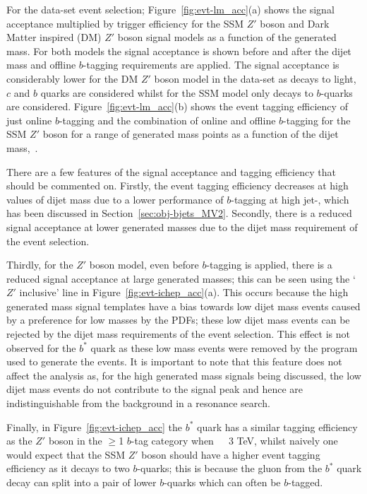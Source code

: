 For the \lm{} data-set event selection;
Figure~\ref{fig:evt-lm_acc}(a) shows the signal acceptance multiplied by trigger efficiency
for the SSM $Z'$ boson and  Dark Matter inspired (DM) $Z'$ boson signal models as a function of the generated mass.
For both models the signal acceptance is shown before and after the
dijet mass and offline $b$-tagging requirements are applied.
The signal acceptance is considerably lower for the DM $Z'$ boson model in the \lm{} data-set
as decays to light, $c$ and $b$ quarks are considered
whilst for the SSM model only decays to $b$-quarks are considered.
Figure~\ref{fig:evt-lm_acc}(b) shows the event tagging efficiency
of just online $b$-tagging and the combination of online and offline $b$-tagging
for the SSM $Z'$ boson for a range of generated mass points
as a function of the dijet mass,~\mjj.

There are a few features of the signal acceptance and tagging efficiency that should be commented on.
Firstly, the event tagging efficiency decreases at high values of dijet mass
due to a lower performance of $b$-tagging at high jet-\pT,
which has been discussed in Section~\ref{sec:obj-bjets_MV2}.
Secondly, there is a reduced signal acceptance at lower generated masses
due to the dijet mass requirement of the event selection.

Thirdly, for the $Z'$ boson model, even before $b$-tagging is applied,
there is a reduced signal acceptance at large generated masses;
this can be seen using the `$Z'$ inclusive' line in Figure~\ref{fig:evt-ichep_acc}(a).
This occurs because the high generated mass signal templates have a bias towards low dijet mass events
caused by a preference for low masses by the PDFs;
these low dijet mass events can be rejected by the dijet mass requirements of the event selection.
This effect is not observed for the $b^*$ quark as these low mass events were removed by the program used to generate the events.
It is important to note that this feature does not affect the analysis as,
for the high generated mass signals being discussed,
the low dijet mass events do not contribute to the signal peak
and hence are indistinguishable from the background in a resonance search.

Finally, in Figure~\ref{fig:evt-ichep_acc} the $b^*$ quark has a similar tagging efficiency
as the $Z'$ boson in the $\geq$1 $b$-tag category when~\mjj~\gt~3 TeV,
whilst naively one would expect that the SSM $Z'$ boson should have a higher
event tagging efficiency as it decays to two $b$-quarks;
this is because the gluon from the $b^*$ quark decay can split into a pair of lower \pT{} $b$-quarks
which can often be $b$-tagged.

